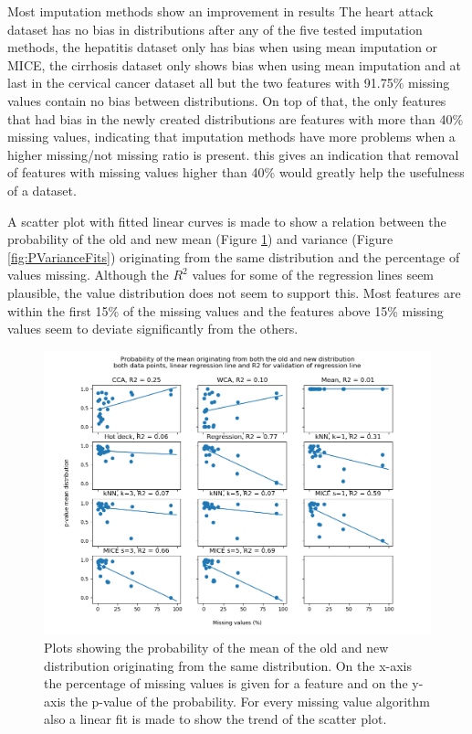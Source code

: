 \documentclass[10pt,a4paper]{report}
\begin{document}
\begin{table}[]
\begin{tabular}{l|ll|lll|ll}
		\end{tabular}
	\end{table}
	
	Most imputation methods show an improvement in results The heart attack dataset has no bias in distributions after any of the five tested imputation methods, the hepatitis dataset only has bias when using mean imputation or MICE, the cirrhosis dataset only shows bias when using mean imputation and at last in the cervical cancer dataset all but the two features with 91.75\% missing values contain no bias between distributions. On top of that, the only features that had bias in the newly created distributions are features with more than 40\% missing values, indicating that imputation methods have more problems when a higher missing/not missing ratio is present. this gives an indication that removal of features with missing values higher than 40\% would greatly help the usefulness of a dataset.
	
	A scatter plot with fitted linear curves is made to show a relation between the probability of the old and new mean (Figure \ref{fig:PMeanFits}) and variance (Figure \ref{fig:PVarianceFits}) originating from the same distribution and the percentage of values missing. Although the $R^2$ values for some of the regression lines seem plausible, the value distribution does not seem to support this. Most features are within the first 15\% of the missing values and the features above 15\% missing values seem to deviate significantly from the others.
	
	\begin{figure}[H]
		\centering
		\includegraphics[width=\textwidth]{Mean_Dist.PNG}
		\caption{Plots showing the probability of the mean of the old and new distribution originating from the same distribution. On the x-axis the percentage of missing values is given for a feature and on the y-axis the p-value of the probability. For every missing value algorithm also a linear fit is made to show the trend of the scatter plot.}
		\label{fig:PMeanFits}
	\end{figure}
	
\end{document}
